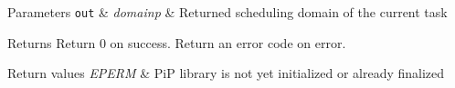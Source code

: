 \begin{DoxyParams}[1]{Parameters}
\mbox{\tt out}  & {\em domainp} & Returned scheduling domain of the current task\\
\hline
\end{DoxyParams}
\begin{DoxyReturn}{Returns}
Return 0 on success. Return an error code on error. 
\end{DoxyReturn}

\begin{DoxyRetVals}{Return values}
{\em E\-P\-E\-R\-M} & Pi\-P library is not yet initialized or already finalized \\
\hline
\end{DoxyRetVals}
